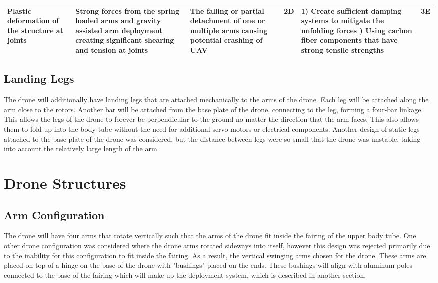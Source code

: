 \begin{table}[]
{\begin{tabularx}{\linewidth}{XXXlXl}
                Plastic deformation of the structure at joints & Strong forces from the spring loaded arms and gravity assisted arm deployment creating significant shearing and tension at joints & The falling or partial detachment of one or multiple arms causing potential crashing of UAV & \cellcolor{orange!25} 2D & 1) Create sufficient damping systems to mitigate the unfolding forces \newline 2) Using carbon fiber components that have strong tensile strengths & \cellcolor{green!25} 3E \\
                \bottomrule
                \end{tabularx}
                }
			\end{table}
			
		\subsection{Landing Legs}
			The drone will additionally have landing legs that are attached mechanically to the arms of the drone. Each leg will be attached along the arm close to the rotors. Another bar will be attached from the base plate of the drone, connecting to the leg, forming a four-bar linkage. This allows the legs of the drone to forever be perpendicular to the ground no matter the direction that the arm faces. This also allows them to fold up into the body tube without the need for additional servo motors or electrical components. Another design of static legs attached to the base plate of the drone was considered, but the distance between legs were so small that the drone was unstable, taking into account the relatively large length of the arm.
			\section{Drone Structures}\label{PL:Design:Structures}
			\subsection{Arm Configuration}
				The drone will have four arms that rotate vertically such that the arms of the drone fit inside the fairing of the upper body tube. One other drone configuration was considered where the drone arms rotated sideways into itself, however this design was rejected primarily due to the inability for this configuration to fit inside the fairing. As a result, the vertical swinging arms chosen for the drone. These arms are placed on top of a hinge on the base of the drone with "bushings" placed on the ends. These bushings will align with aluminum poles connected to the base of the fairing which will make up the deployment system, which is described in another section.
